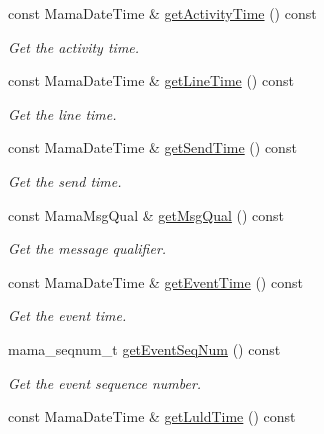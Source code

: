 \begin{CompactItemize}
const Mama\-Date\-Time \& \hyperlink{classWombat_1_1MamdaSecStatusListener_e68b03d56c3402e337a06b63ef5566d1}{get\-Activity\-Time} () const 
\begin{CompactList}\small\item\em Get the activity time. \item\end{CompactList}\item 
const Mama\-Date\-Time \& \hyperlink{classWombat_1_1MamdaSecStatusListener_e879990d8f32b1f28f5ab2fa5e20f441}{get\-Line\-Time} () const 
\begin{CompactList}\small\item\em Get the line time. \item\end{CompactList}\item 
const Mama\-Date\-Time \& \hyperlink{classWombat_1_1MamdaSecStatusListener_74b08a2717cecd05952794bcc3e9165a}{get\-Send\-Time} () const 
\begin{CompactList}\small\item\em Get the send time. \item\end{CompactList}\item 
const Mama\-Msg\-Qual \& \hyperlink{classWombat_1_1MamdaSecStatusListener_a3f070a7969f59ad8110f20d7743ed16}{get\-Msg\-Qual} () const 
\begin{CompactList}\small\item\em Get the message qualifier. \item\end{CompactList}\item 
const Mama\-Date\-Time \& \hyperlink{classWombat_1_1MamdaSecStatusListener_0e27b7c2e100fbc7247c898c56536d1c}{get\-Event\-Time} () const 
\begin{CompactList}\small\item\em Get the event time. \item\end{CompactList}\item 
mama\_\-seqnum\_\-t \hyperlink{classWombat_1_1MamdaSecStatusListener_9abaf40f14dcb761b11026bd8ab7cd7d}{get\-Event\-Seq\-Num} () const 
\begin{CompactList}\small\item\em Get the event sequence number. \item\end{CompactList}\item 
const Mama\-Date\-Time \& \hyperlink{classWombat_1_1MamdaSecStatusListener_e682f4bbb0863a87fac4e03fa77156c0}{get\-Luld\-Time} () const 

\end{CompactItemize}
